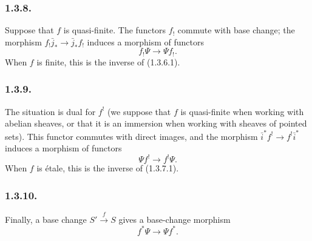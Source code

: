 \subsubsection*{1.3.8.}
Suppose that $f$ is quasi-finite.  The functors $f_!$ commute with base
change; the morphism
$f_!\bar j_*\longrightarrow\bar j_*f_!$ induces a morphism of
functors
\begin{equation}\tag{1.3.8.1}
f_!\Psi\longrightarrow\Psi f_!.
\end{equation}
When $f$ is finite, this is the inverse of (1.3.6.1).

\subsubsection*{1.3.9.}
The situation is dual for $f^!$ (we suppose that $f$ is quasi-finite
when working with abelian sheaves, or that it is an immersion when
working with sheaves of pointed sets).  This functor commutes with
direct images, and the morphism
$\bar i^*f^!\longrightarrow f^!\bar i^*$ induces a morphism of
functors
\begin{equation}\tag{1.3.9.1}
\Psi f^!\longrightarrow f^!\Psi.
\end{equation}
When $f$ is \'{e}tale, this is the inverse of (1.3.7.1).

\subsubsection*{1.3.10.}
Finally, a base change $S'\xrightarrow{f}S$ gives a base-change
morphism
\begin{equation}\tag{1.3.10.1}
f^*\Psi\longrightarrow\Psi f^*.
\end{equation}

